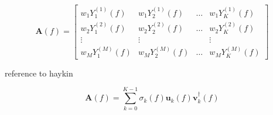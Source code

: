\documentclass[12pt]{article}
\begin{document}
\begin{equation}
    \mathbf{A}(f) = 
    \begin{bmatrix}
        w_1Y_1^{(1)}(f) & w_1Y_2^{(1)}(f) & \ldots & w_1Y_K^{(1)}(f) \\
        w_2Y_1^{(2)}(f) & w_2Y_2^{(2)}(f) & \ldots & w_2Y_K^{(2)}(f) \\
        \vdots & \vdots && \vdots \\
        w_MY_1^{(M)}(f) & w_MY_2^{(M)}(f) & \ldots & w_MY_K^{(M)}(f)
    \end{bmatrix}
\end{equation}

reference to haykin \cite{haykin2005}

\begin{equation}
    \mathbf{A}(f) = \sum_{k=0}^{K-1} \sigma_k(f) \mathbf{u}_k(f) \mathbf{v}_k^{\dag}(f)
\end{equation}



\end{document}
